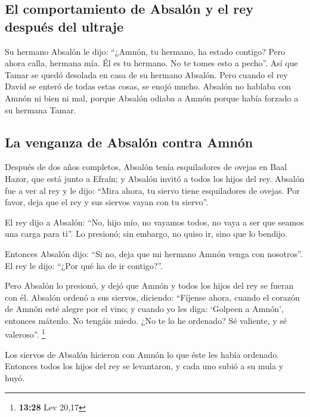 \begin{paracol}{2}
\hypertarget{el-comportamiento-de-absaluxf3n-y-el-rey-despuuxe9s-del-ultraje}{%
\subsection{El comportamiento de Absalón y el rey después del
ultraje}\label{el-comportamiento-de-absaluxf3n-y-el-rey-despuuxe9s-del-ultraje}}

 Su hermano Absalón le dijo: ``¿Amnón, tu hermano, ha
estado contigo? Pero ahora calla, hermana mía. Él es tu hermano. No te
tomes esto a pecho''. Así que Tamar se quedó desolada en casa de su
hermano Absalón.  Pero cuando el rey David se enteró de
todas estas cosas, se enojó mucho.  Absalón no hablaba
con Amnón ni bien ni mal, porque Absalón odiaba a Amnón porque había
forzado a su hermana Tamar.

\hypertarget{la-venganza-de-absaluxf3n-contra-amnuxf3n}{%
\subsection{La venganza de Absalón contra
Amnón}\label{la-venganza-de-absaluxf3n-contra-amnuxf3n}}

 Después de dos años completos, Absalón tenía
esquiladores de ovejas en Baal Hazor, que está junto a Efraín; y Absalón
invitó a todos los hijos del rey.  Absalón fue a ver al
rey y le dijo: ``Mira ahora, tu siervo tiene esquiladores de ovejas. Por
favor, deja que el rey y sus siervos vayan con tu siervo''.

 El rey dijo a Absalón: ``No, hijo mío, no vayamos todos,
no vaya a ser que seamos una carga para ti''. Lo presionó; sin embargo,
no quiso ir, sino que lo bendijo.

 Entonces Absalón dijo: ``Si no, deja que mi hermano
Amnón venga con nosotros''. El rey le dijo: ``¿Por qué ha de ir
contigo?''.

 Pero Absalón lo presionó, y dejó que Amnón y todos los
hijos del rey se fueran con él.  Absalón ordenó a sus
siervos, diciendo: ``Fíjense ahora, cuando el corazón de Amnón esté
alegre por el vino; y cuando yo les diga: `Golpeen a Amnón', entonces
mátenlo. No tengáis miedo. ¿No te lo he ordenado? Sé valiente, y sé
valeroso''. \footnote{\textbf{13:28} Lev 20,17}

 Los siervos de Absalón hicieron con Amnón lo que éste
les había ordenado. Entonces todos los hijos del rey se levantaron, y
cada uno subió a su mula y huyó.


\end{paracol}
